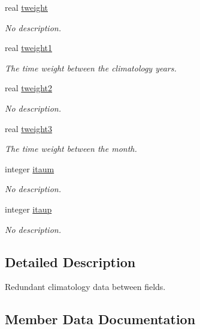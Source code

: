 \begin{DoxyCompactItemize}
real \hyperlink{structinterpolator__mod_1_1interpolate__type_a3b4782d908f8ac72a49fdf05b005a481}{tweight}
\begin{DoxyCompactList}\small\item\em No description. \end{DoxyCompactList}\item 
real \hyperlink{structinterpolator__mod_1_1interpolate__type_adbb2014144021403a46c95b819f51238}{tweight1}
\begin{DoxyCompactList}\small\item\em The time weight between the climatology years. \end{DoxyCompactList}\item 
real \hyperlink{structinterpolator__mod_1_1interpolate__type_a8a643252841aba06a7e723a127c40de8}{tweight2}
\begin{DoxyCompactList}\small\item\em No description. \end{DoxyCompactList}\item 
real \hyperlink{structinterpolator__mod_1_1interpolate__type_ac69c4d87ddcbe4dbc02ab4a6f8f7a455}{tweight3}
\begin{DoxyCompactList}\small\item\em The time weight between the month. \end{DoxyCompactList}\item 
integer \hyperlink{structinterpolator__mod_1_1interpolate__type_ab6fa11384a6e40ef92a0b445bd89feef}{itaum}
\begin{DoxyCompactList}\small\item\em No description. \end{DoxyCompactList}\item 
integer \hyperlink{structinterpolator__mod_1_1interpolate__type_ad9b22dee923011a98e719ed2a7482b6f}{itaup}
\begin{DoxyCompactList}\small\item\em No description. \end{DoxyCompactList}\end{DoxyCompactItemize}


\subsection{Detailed Description}
Redundant climatology data between fields. 

\subsection{Member Data Documentation}
\mbox{\label{structinterpolator__mod_1_1interpolate__type_adb46f9ffb550fcecd7790530e5f1f083}} 
